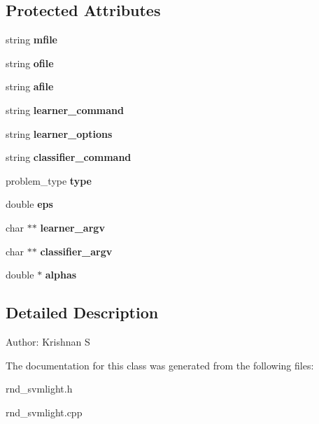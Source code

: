 \subsection*{Protected Attributes}
\begin{CompactItemize}
\item 
string \textbf{mfile}\label{classRND__SVMLight_9dc673309dffed93ec9e424d74b7c0c8}

\item 
string \textbf{ofile}\label{classRND__SVMLight_ad6551a19fa4c845d15bf2f4e251fb38}

\item 
string \textbf{afile}\label{classRND__SVMLight_e6bd8ad15a3059a5cf4676deb5ed6e57}

\item 
string \textbf{learner\_\-command}\label{classRND__SVMLight_35d85aabfa09be45523c27f0a8f43ec2}

\item 
string \textbf{learner\_\-options}\label{classRND__SVMLight_7824bb0d04370bf6470603cb4d042596}

\item 
string \textbf{classifier\_\-command}\label{classRND__SVMLight_8e9d7f85bab74d99e7a0d2608ed3fb18}

\item 
problem\_\-type \textbf{type}\label{classRND__SVMLight_357ef192974d303484d8cf23f7aec9aa}

\item 
double \textbf{eps}\label{classRND__SVMLight_d70adfe6fc6f4113797434be5f9805f6}

\item 
char $\ast$$\ast$ \textbf{learner\_\-argv}\label{classRND__SVMLight_6a5d59f8c96e3e4de0424d56e5eae54d}

\item 
char $\ast$$\ast$ \textbf{classifier\_\-argv}\label{classRND__SVMLight_6483455b9c90daac513634dc0794b203}

\item 
double $\ast$ \textbf{alphas}\label{classRND__SVMLight_c1fa273dfb7dc3ca14aeb7dfd3a38f9e}

\end{CompactItemize}


\subsection{Detailed Description}
\begin{Desc}
\item[Author:]Krishnan S \end{Desc}




The documentation for this class was generated from the following files:\begin{CompactItemize}
\item 
rnd\_\-svmlight.h\item 
rnd\_\-svmlight.cpp\end{CompactItemize}
